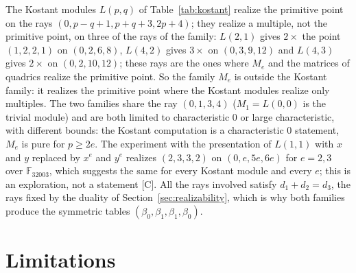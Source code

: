 \documentclass[11pt]{article}
\theoremstyle{definition}
\theoremstyle{remark}
\newcommand{\F}{\mathbb{F}}
\begin{document}
The Kostant modules $L(p,q)$ of Table~\ref{tab:kostant} realize the primitive point on the rays $(0,p-q+1,p+q+3,2p+4)$; they realize a multiple, not the primitive point, on three of the rays of the family: $L(2,1)$ gives $2\times$ the point $(1,2,2,1)$ on $(0,2,6,8)$, $L(4,2)$ gives $3\times$ on $(0,3,9,12)$ and $L(4,3)$ gives $2\times$ on $(0,2,10,12)$; these rays are the ones where $M_e$ and the matrices of quadrics realize the primitive point. So the family $M_e$ is outside the Kostant family: it realizes the primitive point where the Kostant modules realize only multiples. The two families share the ray $(0,1,3,4)$ ($M_1=L(0,0)$ is the trivial module) and are both limited to characteristic $0$ or large characteristic, with different bounds: the Kostant computation is a characteristic $0$ statement, $M_e$ is pure for $p\ge2e$. The experiment with the presentation of $L(1,1)$ with $x$ and $y$ replaced by $x^e$ and $y^e$ realizes $(2,3,3,2)$ on $(0,e,5e,6e)$ for $e=2,3$ over $\F_{32003}$, which suggests the same for every Kostant module and every $e$; this is an exploration, not a statement [C]. All the rays involved satisfy $d_1+d_2=d_3$, the rays fixed by the duality of Section~\ref{sec:realizability}, which is why both families produce the symmetric tables $(\beta_0,\beta_1,\beta_1,\beta_0)$.

\FloatBarrier
\section{Limitations}
\label{sec:limitations}
\end{document}
